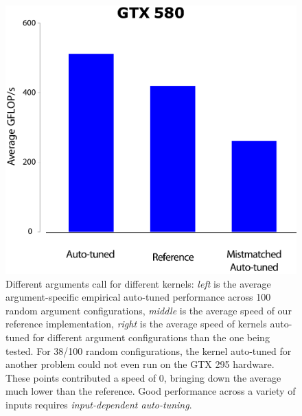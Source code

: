 \documentclass{sig-alternate}
\begin{document}
\begin{figure}[!t]
\centering
\includegraphics[width=\linewidth]{illustrator/fig_allstars_mixup_580_R1.pdf}
\caption{Different arguments call for different kernels:
{\em left} is the average argument-specific empirical
auto-tuned performance across 100 random argument configurations,
{\em middle} is the average speed of our reference implementation,
{\em right} is the average speed of kernels auto-tuned for different argument
configurations than the one being tested.  For 38/100 random configurations, the
kernel auto-tuned for another problem could not even run on the GTX 295
hardware.  These points contributed a speed of 0, bringing down the average
much lower than the reference.  Good performance across a variety of inputs
requires {\em input-dependent auto-tuning}.
}
\label{fig:allstars}
\end{figure}
\end{document}
